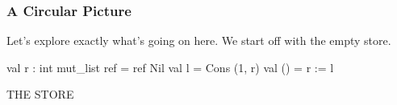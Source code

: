 \documentclass[aspectratio=169]{beamer}
\newcommand{\topthing}[2]{
      \begin{minipage}[t][#1][t]{\textwidth}
        \vspace{\fill}
        #2
        \vspace{\fill}
      \end{minipage}
    }
\begin{document}
\begin{frame}[fragile]
  \frametitle{A Circular Picture}

  \topthing{0.2in}{
    Let's explore exactly what's going on here. We start off with the empty store.
  }

  \vspace{10pt}

  \begin{center}
    \begin{minipage}[t][2.1in][t]{0.55\textwidth}
      \vspace{\fill}
      \small
      \begin{codeblock}
        val r : int mut_list ref = ref Nil
        val l = Cons (1, r)
        val () = r := l
      \end{codeblock}
      \vspace{\fill}
    \end{minipage}
    \hfill\vline\hfill
    \begin{minipage}[t][2.1in][t]{0.35\textwidth}
      \centering
      {\hspace{-20pt}\color{gray} \large THE STORE}

      \vspace{\fill}
      \begin{tikzpicture}
      \end{tikzpicture}
      \vspace{\fill}
    \end{minipage}
  \end{center}
\end{frame}
\end{document}
